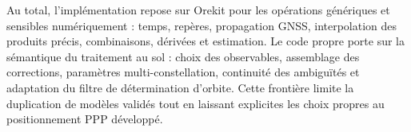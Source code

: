 Au total, l'implémentation repose sur Orekit pour les opérations génériques et
sensibles numériquement : temps, repères, propagation GNSS, interpolation des
produits précis, combinaisons, dérivées et estimation. Le code propre porte sur
la sémantique du traitement au sol : choix des observables, assemblage des
corrections, paramètres multi-constellation, continuité des ambiguïtés et
adaptation du filtre de détermination d'orbite. Cette frontière limite la
duplication de modèles validés tout en laissant explicites les choix propres au
positionnement PPP développé.
